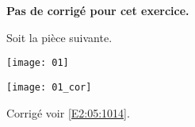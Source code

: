 \normaltrue \difficilefalse \tdifficilefalse
\correctionfalse


\setcounter{numques}{0}

\ifcorrection
\else
\textbf{Pas de corrigé pour cet exercice.}
\fi


\ifprof 
\else
Soit la pièce suivante.
\begin{center}
\texttt{[image: 01]}
\end{center}
 \fi
 
\ifprof
\begin{center}
\texttt{[image: 01\_cor]}
\end{center}
\else 

\fi

\ifprof
\else
\begin{flushright}
\footnotesize{Corrigé  voir \ref{E2:05:1014}.}
\end{flushright}%
\fi